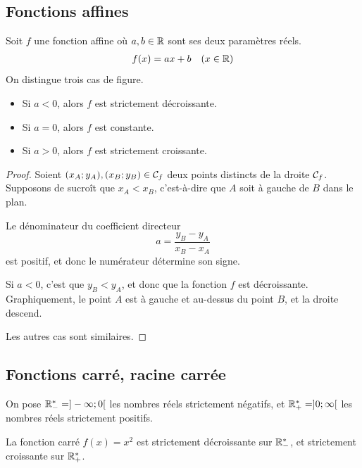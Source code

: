\documentclass[a4paper, 12pt]{report}
\begin{document}
\subsection{Fonctions affines}

\begin{thm}
	Soit $f$ une fonction affine où $a, b \in\mathbb{R}$ sont ses deux paramètres réels.
		\begin{align*}
			f(x) = a x + b && (x\in\mathbb{R})
		\end{align*}
	On distingue trois cas de figure.
		\begin{itemize}
			\item Si $a < 0$, alors $f$ est strictement décroissante.
			\item Si $a=0$, alors $f$ est constante.
			\item Si $a>0$, alors $f$ est strictement croissante.
		\end{itemize}
\end{thm}

\begin{proof}
	Soient $(x_A;y_A), (x_B; y_B) \in \mathcal{C}_f$ deux points distincts de la droite $\mathcal{C}_f$.
	Supposons de sucroît que $x_A < x_B$, c'est-à-dire que $A$ soit à gauche de $B$ dans le plan.
	
	Le dénominateur du coefficient directeur
		\[ a = \dfrac{y_B - y_A}{x_B-x_A} \]
	 est positif, et donc le numérateur détermine son signe.
	 
	 Si $a<0$, c'est que $y_B < y_A$, et donc que la fonction $f$ est décroissante.
	 Graphiquement, le point $A$ est à gauche et au-dessus du point $B$, et la droite descend.
	 
	 Les autres cas sont similaires.
\end{proof}

\subsection{Fonctions carré, racine carrée}

\begin{nota}
	On pose $\mathbb{R}_-^* = ]-\infty ; 0[$ les nombres réels strictement négatifs, et $\mathbb{R}_+^* = ]0 ; \infty[$ les nombres réels strictement positifs.
\end{nota}

\begin{thm}
	La fonction carré $f(x) = x^2$ est strictement décroissante sur $\mathbb{R}_-^*$, et strictement croissante sur $\mathbb{R}_+^*$.
\end{thm}
\end{document}
